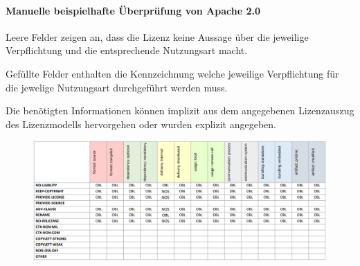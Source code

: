 \paragraph{Manuelle beispielhafte Überprüfung von Apache 2.0}

Leere Felder zeigen an, dass die Lizenz keine Aussage über die jeweilige Verpflichtung und die entsprechende Nutzungsart macht. 

Gefüllte Felder enthalten die Kennzeichnung welche jeweilige Verpflichtung für die jewelige Nutzungsart  durchgeführt werden muss. 

Die benötigten Informationen können implizit aus dem angegebenen Lizenzauszug des Lizenzmodells hervorgehen oder wurden explizit angegeben. 

\begin{figure}[p]
    \centering
    \includegraphics[angle=90, scale=0.5]{Bilder/Manuelle Checkliste.png}
\end{figure}






